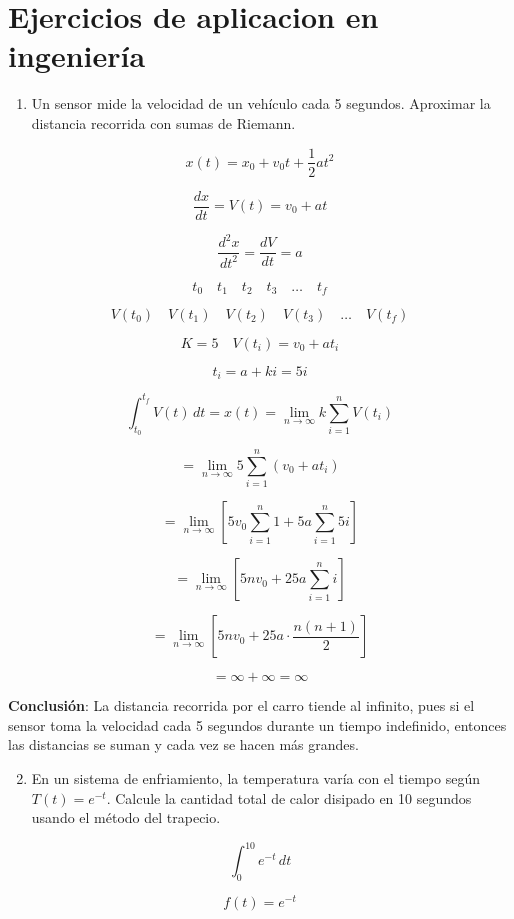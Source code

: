 \section{Ejercicios de aplicacion en ingeniería}
\begin{enumerate}
    \item Un sensor mide la velocidad de un vehículo cada 5 segundos. Aproximar la distancia recorrida con sumas de Riemann.
\end{enumerate}

\[
x(t) = x_0 + v_0 t + \frac{1}{2} a t^2
\]

\[
\frac{d x}{dt} = V(t) = v_0 + a t
\]

\[
\frac{d^2 x}{dt^2} = \frac{dV}{dt} = a
\]

\[
t_0 \quad t_1 \quad t_2 \quad t_3 \quad \dots \quad t_f
\]

\[
V(t_0) \quad V(t_1) \quad V(t_2) \quad V(t_3) \quad \dots \quad V(t_f)
\]

\[
K = 5 \quad V(t_i) = v_0 + a t_i
\]

\[
t_i = a + k i = 5i
\]

\[
\int_{t_0}^{t_f} V(t) \, dt = x(t) = \lim_{n \to \infty} k \sum_{i=1}^{n} V(t_i)
\]

\[
= \lim_{n \to \infty} 5 \sum_{i=1}^{n} \left( v_0 + a t_i \right)
\]

\[
= \lim_{n \to \infty} \left[ 5 v_0 \sum_{i=1}^{n} 1 + 5 a \sum_{i=1}^{n} 5 i \right]
\]

\[
= \lim_{n \to \infty} \left[ 5 n v_0 + 25 a \sum_{i=1}^{n} i \right]
\]

\[
= \lim_{n \to \infty} \left[ 5 n v_0 + 25 a \cdot \frac{n(n+1)}{2} \right]
\]

\[
= \infty + \infty = \infty
\]

\textbf{Conclusión}: La distancia recorrida por el carro tiende al infinito, pues si
el sensor toma la velocidad cada 5 segundos durante un tiempo indefinido,
entonces las distancias se suman y cada vez se hacen más grandes.

\begin{enumerate}
    \setcounter{enumi}{1}
    \item En un sistema de enfriamiento, la temperatura varía con el tiempo según $T(t) = e^{-t}$. Calcule la cantidad total de calor disipado en 10 segundos usando el método del trapecio.
\end{enumerate}

\[
\int_{0}^{10} e^{-t} \, dt
\]

\[
f(t) = e^{-t}
\]

